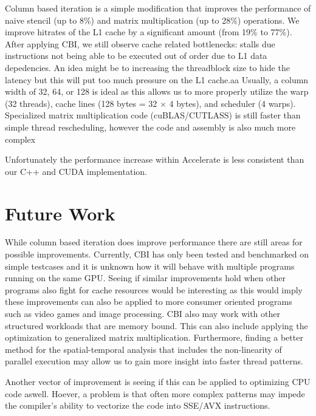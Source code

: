 Column based iteration is a simple modification that improves the performance of naive stencil (up to 8\%) and matrix multiplication (up to 28\%) operations.
We improve hitrates of the L1 cache by a significant amount (from 19\% to 77\%).
After applying CBI, we still observe cache related bottlenecks: stalls due instructions not being able to be executed out of order due to L1 data depedencies.
An idea might be to increasing the threadblock size to hide the latency but this will put too much pressure on the L1 cache.aa
Usually, a column width of 32, 64, or 128 is ideal as this allows us to more properly utilize the warp (32 threads), cache lines (128 bytes = 32 $\times$ 4 bytes), and scheduler (4 warps).
Specialized matrix multiplication code (cuBLAS/CUTLASS) is still faster than simple thread rescheduling, however the code and assembly is also much more complex

Unfortunately the performance increase within Accelerate is less consistent than our C++ and CUDA implementation. 

\section{Future Work}
While column based iteration does improve performance there are still areas for possible improvements.
Currently, CBI has only been tested and benchmarked on simple testcases and it is unknown how it will behave with multiple programs running on the same GPU.
Seeing if similar improvements hold when other programs also fight for cache resources would be interesting as this would imply these improvements can also be applied to more consumer oriented programs such as video games and image processing.
CBI also may work with other structured workloads that are memory bound.
This can also include applying the optimization to generalized matrix multiplication.
Furthermore, finding a better method for the spatial-temporal analysis that includes the non-linearity of parallel execution may allow us to gain more insight into faster thread patterns.

Another vector of improvement is seeing if this can be applied to optimizing CPU code aswell.
Hoever, a problem is that often more complex patterns may impede the compiler's ability to vectorize the code into SSE/AVX instructions.
